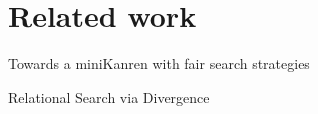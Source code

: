 \section{Related work}

Towards a miniKanren with fair search strategies~\cite{fair:towardsAM}

Relational Search via Divergence~\cite{fair:DivTest}